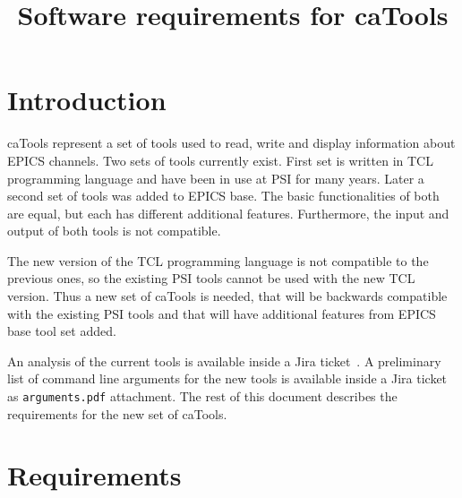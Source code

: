 \documentclass[12pt,a4paper]{article}
\title{Software requirements for caTools}
\date{}
\begin{document}
\maketitle


\section{Introduction}
caTools represent a set of tools used to read, write and display information about EPICS channels. Two sets of tools currently exist. First set is written in TCL programming language and have been in use at PSI for many years. Later a second set of tools was added to EPICS base. The basic functionalities of both are equal, but each has different additional features. Furthermore, the input and output of both tools is not compatible. 

The new version of the TCL programming language is not compatible to the previous ones, so the existing PSI tools cannot be used with the new TCL version. Thus a new set of caTools is needed, that will be backwards compatible with the existing PSI tools and that will have additional features from EPICS base tool set added.

An analysis of the current tools is available inside a Jira ticket~\cite{jira_analyze}. A preliminary list of command line arguments for the new tools is available inside a Jira ticket~\cite{jira_requirements} as \texttt{arguments.pdf} attachment. The rest of this document describes the requirements for the new set of caTools.

\section{Requirements}
\end{document}
